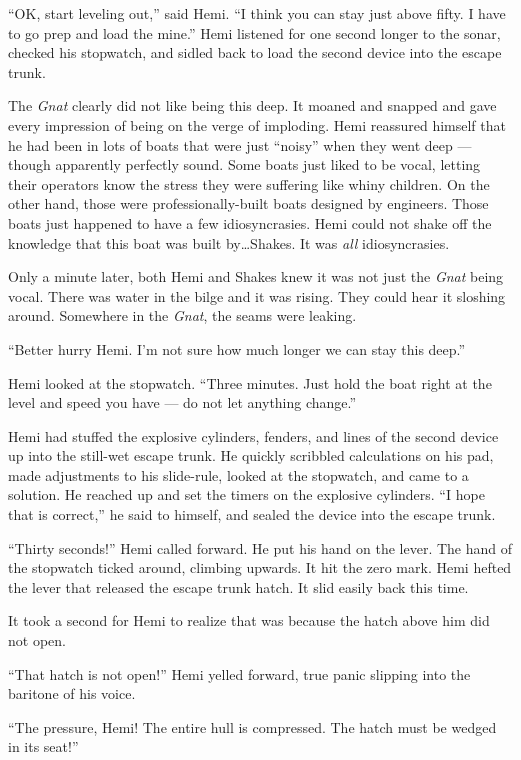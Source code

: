 \documentclass[
]{scrbook}
\begin{document}
``OK, start leveling out,'' said Hemi. ``I think you can stay just above
fifty. I have to go prep and load the mine.'' Hemi listened for one
second longer to the sonar, checked his stopwatch, and sidled back to
load the second device into the escape trunk.

The \emph{Gnat} clearly did not like being this deep. It moaned and
snapped and gave every impression of being on the verge of imploding.
Hemi reassured himself that he had been in lots of boats that were just
``noisy'' when they went deep --- though apparently perfectly sound.
Some boats just liked to be vocal, letting their operators know the
stress they were suffering like whiny children. On the other hand, those
were professionally-built boats designed by engineers. Those boats just
happened to have a few idiosyncrasies. Hemi could not shake off the
knowledge that this boat was built by\ldots Shakes. It was \emph{all}
idiosyncrasies.

Only a minute later, both Hemi and Shakes knew it was not just the
\emph{Gnat} being vocal. There was water in the bilge and it was rising.
They could hear it sloshing around. Somewhere in the \emph{Gnat}, the
seams were leaking.

``Better hurry Hemi. I'm not sure how much longer we can stay this
deep.''

Hemi looked at the stopwatch. ``Three minutes. Just hold the boat right
at the level and speed you have --- do not let anything change.''

Hemi had stuffed the explosive cylinders, fenders, and lines of the
second device up into the still-wet escape trunk. He quickly scribbled
calculations on his pad, made adjustments to his slide-rule, looked at
the stopwatch, and came to a solution. He reached up and set the timers
on the explosive cylinders. ``I hope that is correct,'' he said to
himself, and sealed the device into the escape trunk.

``Thirty seconds!'' Hemi called forward. He put his hand on the lever.
The hand of the stopwatch ticked around, climbing upwards. It hit the
zero mark. Hemi hefted the lever that released the escape trunk hatch.
It slid easily back this time.

It took a second for Hemi to realize that was because the hatch above
him did not open.

``That hatch is not open!'' Hemi yelled forward, true panic slipping
into the baritone of his voice.

``The pressure, Hemi! The entire hull is compressed. The hatch must be
wedged in its seat!''
\end{document}
